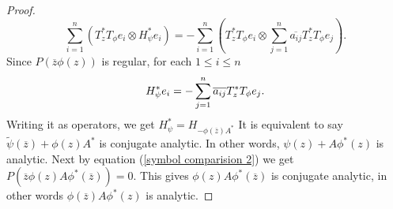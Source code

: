 \documentclass[12pt, reqno]{amsart}
\theoremstyle{definition}
\theoremstyle{remark}
\numberwithin{equation}{section}
\begin{document}
\begin{proof}
            \begin{equation*}
                \sum_{i=1}^{n} (T_z^*T_\phi e_i \otimes H^*_\psi e_i)=-\sum_{i=1}^{n}(T_z^*T_\phi e_i \otimes \sum_{j=1}^{n}\overline{a_{ij}}T^*_zT_\phi e_j).
            \end{equation*}
            Since $P(\overline z \phi(z))$ is regular, for each $1\leq i\leq n$
            \begin{equation*}
                 H^*_\psi e_i=-\sum_{j=1}^{n}\overline{a_{ij}}T^*_zT_\phi e_j.\\
            \end{equation*}
            Writing it as operators, we get
                 $H_\psi^*=H_{-\phi(\overline z)A^*}$
            It is equivalent to say $\tilde \psi(\overline z)+\phi(z)A^*$ is conjugate analytic. In other words, $\psi(z)+A\phi^*(z)$ is analytic. Next by equation (\ref{symbol comparision 2}) we get $P(\overline z\phi(z)A\phi^*(\overline{z}))=0.$ This gives $\phi(z)A\phi^*(\overline{z})$ is conjugate analytic, in other words $\phi(\overline z)A\phi^*(z)$ is analytic.
        \end{proof}
    
\end{document}
